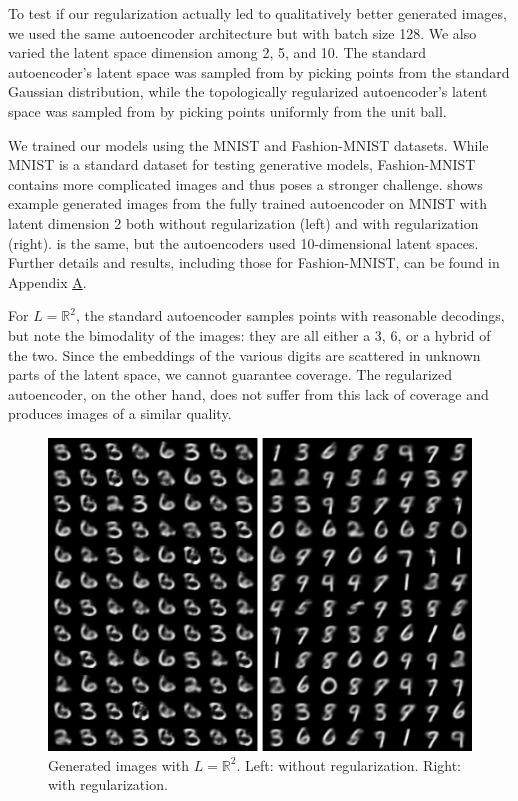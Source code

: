 \documentclass[conference]{IEEEtran}
\newcommand{\R}{\mathbb{R}}
\begin{document}
To test if our regularization actually led to qualitatively better generated images, we used the same autoencoder architecture but with batch size 128. We also varied the latent space dimension among 2, 5, and 10. The standard autoencoder's latent space was sampled from by picking points from the standard Gaussian distribution, while the topologically regularized autoencoder's latent space was sampled from by picking points uniformly from the unit ball.

We trained our models using the MNIST and Fashion-MNIST datasets. While MNIST is a standard dataset for testing generative models, Fashion-MNIST contains more complicated images and thus poses a stronger challenge.  shows example generated images from the fully trained autoencoder on MNIST with latent dimension 2 both without regularization (left) and with regularization (right).  is the same, but the autoencoders used 10-dimensional latent spaces. Further details and results, including those for Fashion-MNIST, can be found in Appendix \hyperref[experiment-details]{A}.

For $L=\R^2$, the standard autoencoder samples points with reasonable decodings, but note the bimodality of the images: they are all either a 3, 6, or a hybrid of the two. Since the embeddings of the various digits are scattered in unknown parts of the latent space, we cannot guarantee coverage. The regularized autoencoder, on the other hand, does not suffer from this lack of coverage and produces images of a similar quality.

\begin{figure}[H]
	\centering
	\includegraphics[scale=0.4]{fig/ae-2-comparison.png}
	\caption{Generated images with $L=\R^2$. Left: without regularization. Right: with regularization.}
	\label{ae-2-comparison}
\end{figure}
\end{document}
